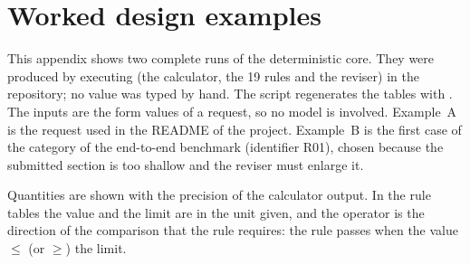 \chapter{Worked design examples}\label{app:example}

This appendix shows two complete runs of the deterministic core. They were produced by executing  (the calculator, the 19 rules and the reviser) in the repository; no value was typed by hand. The script  regenerates the tables with . The inputs are the form values of a  request, so no model is involved. Example~A is the request used in the README of the project. Example~B is the first case of the  category of the end-to-end benchmark (identifier R01), chosen because the submitted section is too shallow and the reviser must enlarge it.

Quantities are shown with the precision of the calculator output. In the rule tables the value and the limit are in the unit given, and the operator is the direction of the comparison that the rule requires: the rule passes when the value $\le$ (or $\ge$) the limit.


